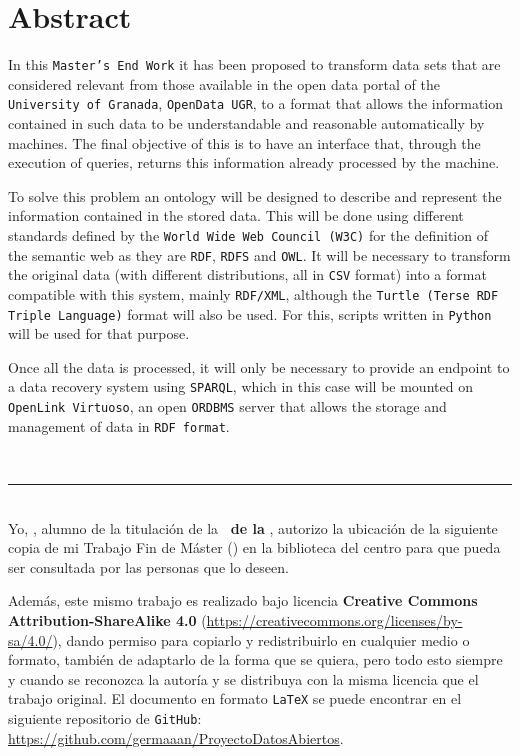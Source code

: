 \section*{Abstract}

In this {\tt Master's End Work} it has been proposed to transform data sets that are considered relevant from those available in the open data portal of the {\tt University of Granada}, {\tt OpenData UGR}, to a format that allows the information contained in such data to be understandable and reasonable automatically by machines. The final objective of this is to have an interface that, through the execution of queries, returns this information already processed by the machine.
\bigskip

To solve this problem an ontology will be designed to describe and represent the information contained in the stored data. This will be done using different standards defined by the {\tt World Wide Web Council (W3C)} for the definition of the semantic web as they are {\tt RDF}, {\tt RDFS} and {\tt OWL}. It will be necessary to transform the original data (with different distributions, all in {\tt CSV} format) into a format compatible with this system, mainly {\tt RDF/XML}, although the {\tt Turtle (Terse RDF Triple Language)} format will also be used. For this, scripts written in {\tt Python} will be used for that purpose.

\bigskip
Once all the data is processed, it will only be necessary to provide an endpoint to a data recovery system using {\tt SPARQL}, which in this case will be mounted on {\tt OpenLink Virtuoso}, an open {\tt ORDBMS} server that allows the storage and management of data in {\tt RDF format}.

\newpage
\thispagestyle{empty}
\
\vspace{3cm}

\noindent\rule[-1ex]{\textwidth}{2pt}\\[4.5ex]

Yo, \textbf{\autor}, alumno de la titulación \textbf{\master} de la \textbf{\escuela\ de la \universidad}, autorizo la ubicación de la siguiente copia de mi Trabajo Fin de Máster (\textit{\titulo}) en la biblioteca del centro para que pueda ser consultada por las personas que lo deseen.

\bigskip
Además, este mismo trabajo es realizado bajo licencia \textbf{Creative Commons Attribution-ShareAlike 4.0} (\url{https://creativecommons.org/licenses/by-sa/4.0/}), dando permiso para copiarlo y redistribuirlo en cualquier medio o formato, también de adaptarlo de la forma que se quiera, pero todo esto siempre y cuando se reconozca la autoría y se distribuya con la misma licencia que el trabajo original. El documento en formato {\tt LaTeX} se puede encontrar en el siguiente repositorio de {\tt GitHub}: \url{https://github.com/germaaan/ProyectoDatosAbiertos}.

